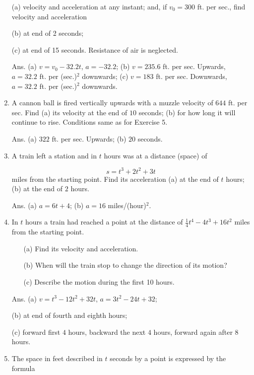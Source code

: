 \begin{enumerate}
(a) velocity and acceleration at any instant; and, if 
$v_0 = 300$ ft. per sec., find velocity and acceleration 

(b) at end of 2 seconds; 

(c) at end of 15 seconds. Resistance of air is neglected.

Ans. 	(a) $v = v_0 - 32.2t$, $a = - 32.2$;
  	(b) $v = 235.6$ ft. per sec. Upwards,
  	$a = 32.2$ ft. per (sec.)$^2$ downwards;
  	(c) $v = 183$ ft. per sec. Downwards,
  	$a = 32.2$ ft. per (sec.)$^2$ downwards.

\item
A cannon ball is fired vertically upwards with a muzzle 
velocity of $644$ ft. per sec. Find (a) its velocity at the end of 
$10$ seconds; (b) for how long it will continue to rise. 
Conditions same as for Exercise 5.

Ans. (a) $322$ ft. per sec. Upwards; (b) $20$ seconds.

\item
A train left a station and in $t$ hours was at a distance (space) of

\[
 s = t^3 + 2t^2 + 3t
\]
miles from the starting point. Find its acceleration 
(a) at the end of $t$ hours; (b) at the end of $2$ hours.

Ans. 	(a) $a = 6t + 4$; (b) $a = 16$ miles/(hour)$^2$.
\item
In $t$ hours a train had reached a point at the distance of 
$\frac{1}{4} t^4 - 4t^3 + 16t^2$ miles from the starting point. 

\begin{itemize}
\item[(a)] 
Find its velocity and acceleration. 

\item[(b)] 
When will the train stop to change the direction of its motion? 

\item[(c)] 
Describe the motion during the first 10 hours.
\end{itemize}

Ans. 	(a) $v = t^3 - 12t^2 + 32t$, $a = 3t^2 - 24t + 32$;

  	(b) at end of fourth and eighth hours;

  	(c) forward first $4$ hours, backward the next $4$ hours, 
forward again after $8$ hours.

\item
The space in feet described in $t$ seconds by a point is expressed by the formula


\end{enumerate}
